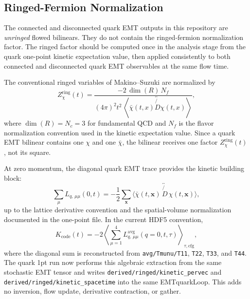 \documentclass[11pt,a4paper]{article}
\newcommand{\code}[1]{\texttt{#1}}
\begin{document}
\subsection{Ringed-Fermion Normalization}

The connected and disconnected quark EMT outputs in this repository are
\emph{unringed} flowed bilinears.  They do not contain the ringed-fermion
normalization factor.  The ringed factor should be computed once in the analysis
stage from the quark one-point kinetic expectation value, then applied
consistently to both connected and disconnected quark EMT observables at the
same flow time.

The conventional ringed variables of Makino--Suzuki are normalized by
\begin{equation}
  Z_{\chi}^{\mathrm{ring}}(t)
  =
  \frac{-2\,\dim(R)\,N_f}
       {(4\pi)^2 t^2\,
        \left\langle
        \bar{\chi}(t,x)\overleftrightarrow{\not{D}}\chi(t,x)
        \right\rangle},
\end{equation}
where \(\dim(R)=N_c=3\) for fundamental QCD and \(N_f\) is the flavor
normalization convention used in the kinetic expectation value.  Since a quark
EMT bilinear contains one \(\chi\) and one \(\bar\chi\), the bilinear receives
one factor \(Z_{\chi}^{\mathrm{ring}}(t)\), not its square.

At zero momentum, the diagonal quark EMT trace provides the kinetic building
block:
\begin{equation}
  \sum_{\mu} L_{q,\,\mu\mu}(0,t)
  = -\frac{1}{2}\sum_{\mathbf{x}}
    \big\langle
      \bar{\chi}(t,\mathbf{x})\,
      \overleftrightarrow{\not{D}}\,
      \chi(t,\mathbf{x})
    \big\rangle,
\end{equation}
up to the lattice derivative convention and the spatial-volume normalization
documented in the one-point file.  In the current HDF5 convention,
\begin{equation}
  K_{\mathrm{code}}(t)
  =
  -2\left\langle
  \sum_{\mu=1}^{4}
  L_{q,\,\mu\mu}^{\mathrm{avg}}(q=0,t,\tau)
  \right\rangle_{\tau,\mathrm{cfg}},
\end{equation}
where the diagonal sum is reconstructed from \code{avg/Tmunu/T11},
\code{T22}, \code{T33}, and \code{T44}.  The quark 1pt run now performs this
algebraic extraction from the same stochastic EMT tensor and writes
\code{derived/ringed/kinetic\_pervec} and
\code{derived/ringed/kinetic\_spacetime} into the same EMTquarkLoop.
This adds no inversion, flow update, derivative contraction, or gather.
\end{document}
